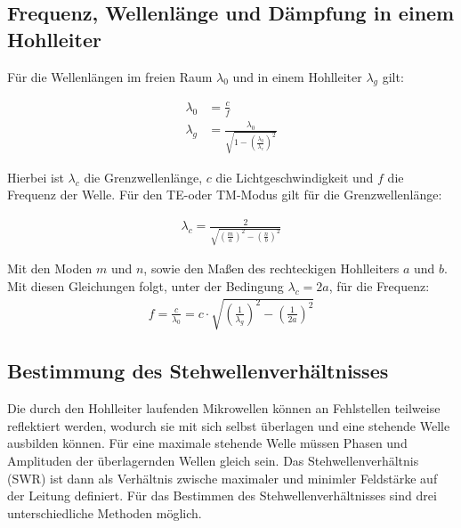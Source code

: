 \subsection{Frequenz, Wellenlänge und Dämpfung in einem Hohlleiter}
Für die Wellenlängen im freien Raum $\lambda_0$ und in einem Hohlleiter $\lambda_g$ gilt:

\begin{align}
  \lambda_0 &= \frac{c}{f} \\
  \lambda_g &= \frac{\lambda_0}{\sqrt{1- \left( \frac{\lambda_0}{\lambda_c} \right)^2}}
\end{align}

Hierbei ist $\lambda_c$ die Grenzwellenlänge, $c$ die Lichtgeschwindigkeit und $f$
die Frequenz der Welle. Für den TE-oder TM-Modus gilt für die
Grenzwellenlänge:

\begin{align}
  \lambda_c = \frac{2}{\sqrt{\left(\frac{m}{a} \right)^2 - \left(\frac{n}{b} \right)^2}}
\end{align}

Mit den Moden $m$ und $n$, sowie den Maßen des rechteckigen Hohlleiters $a$ und $b$.
Mit diesen Gleichungen folgt, unter der Bedingung $\lambda_c=2a$, für die Frequenz:
\begin{align}
  f = \frac{c}{\lambda_0} = c \cdot \sqrt{\left(\frac{1}{\lambda_g}\right)^2 - \left(\frac{1}{2a}\right)^2}
\end{align}




\subsection{Bestimmung des Stehwellenverhältnisses}
Die durch den Hohlleiter laufenden Mikrowellen können an Fehlstellen teilweise reflektiert
werden, wodurch sie mit sich selbst überlagen und eine stehende Welle ausbilden können.
Für eine maximale stehende Welle müssen Phasen und Amplituden der überlagernden Wellen
gleich sein. Das Stehwellenverhältnis (SWR) ist dann als Verhältnis zwische maximaler
und minimler Feldstärke auf der Leitung definiert. Für das Bestimmen des Stehwellenverhältnisses
sind drei unterschiedliche Methoden möglich.

